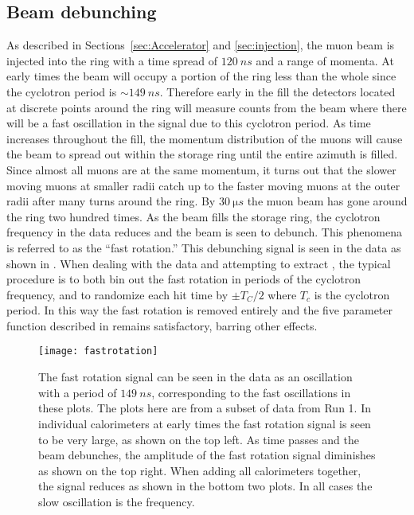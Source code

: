 \subsection{Beam debunching}
\label{sub:beam_debunching}

As described in Sections~\ref{sec:Accelerator} and \ref{sec:injection}, the muon beam is injected into the ring with a time spread of $\SI{120}{ns}$ and a range of momenta. At early times the beam will occupy a portion of the ring less than the whole since the cyclotron period is $\sim\SI{149}{ns}$. Therefore early in the fill the detectors located at discrete points around the ring will measure counts from the beam where there will be a fast oscillation in the signal due to this cyclotron period. As time increases throughout the fill, the momentum distribution of the muons will cause the beam to spread out within the storage ring until the entire azimuth is filled. Since almost all muons are at the same momentum, it turns out that the slower moving muons at smaller radii catch up to the faster moving muons at the outer radii after many turns around the ring. By $\SI{30}{\micro s}$ the muon beam has gone around the ring two hundred times. As the beam fills the storage ring, the cyclotron frequency in the data reduces and the beam is seen to debunch. This phenomena is referred to as the ``fast rotation.'' This debunching signal is seen in the data as shown in . When dealing with the data and attempting to extract \wa, the typical procedure is to both bin out the fast rotation in periods of the cyclotron frequency, and to randomize each hit time by $\pm T_{C}/2$ where $T_{c}$ is the cyclotron period. In this way the fast rotation is removed entirely and the five parameter function described in  remains satisfactory, barring other effects.

\begin{figure}[]
    \centering
    \texttt{[image: fastrotation]}
    \caption[Beam debunching fast rotation]{The fast rotation signal can be seen in the data as an oscillation with a period of $\SI{149}{ns}$, corresponding to the fast oscillations in these plots. The plots here are from a subset of data from Run 1. In individual calorimeters at early times the fast rotation signal is seen to be very large, as shown on the top left. As time passes and the beam debunches, the amplitude of the fast rotation signal diminishes as shown on the top right. When adding all calorimeters together, the signal reduces as shown in the bottom two plots. In all cases the slow oscillation is the \gmtwo frequency.}
    \label{fig:fastrotation}
\end{figure}



